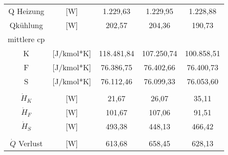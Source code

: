 \begin{table}[h!]
{\begin{tabular}{|c|c|c|c|c|}
 			Q Heizung           & {[}W{]}& 1.229,63   & 1.229,95   & 1.228,88   \\
 			Qkühlung          &{[}W{]}   & 202,57     & 204,36     & 190,73     \\
 			\hline
 			mittlere cp  & &            &            &            \\
 			K                          &{[}J/kmol*K{]} & 118.481,84 & 107.250,74 & 100.858,51 \\
 			F                          &{[}J/kmol*K{]} & 76.386,75  & 76.402,66  & 76.400,73  \\
 			S                          & {[}J/kmol*K{]}& 76.112,46  & 76.099,33  & 76.053,60  \\
 		\hline
 			& &            &            &            \\
 			$\dot{H}_K$                         &[W] & 21,67      & 26,07      & 35,11      \\
 			$\dot{H}_F$                         &[W] & 101,67     & 107,06     & 91,51      \\
 			$\dot{H}_S$                         & [W]& 493,38     & 448,13     & 466,42     \\
 			& &            &            &            \\
 			$\dot{Q}$ Verlust           &[W] & 613,68     & 658,45     & 628,13      	\\
 			\hline
 				\end{tabular}
 	}
 \end{table}
 \FloatBarrier
 \vspace*{-2.5mm}
